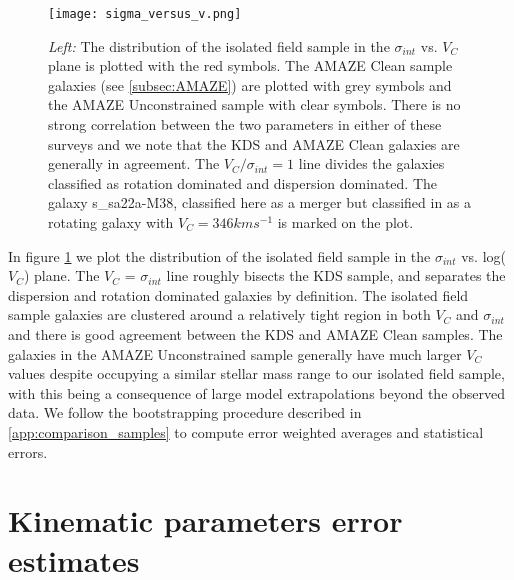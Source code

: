 \documentclass[fleqn,usenatbib]{mn2e}
\begin{document}
\begin{figure}
\centering \hspace{-1.13cm}
\texttt{[image: sigma\_versus\_v.png]}
\caption{{\it Left:} The distribution of the isolated field sample in the $\sigma_{int}$ vs. $V_{C}$ plane is plotted with the red symbols.
The AMAZE Clean sample galaxies (see \protect\cref{subsec:AMAZE}) are plotted with grey symbols and the AMAZE Unconstrained sample with clear symbols.    There is no strong correlation between the two parameters in either of these surveys and we note that the KDS and AMAZE Clean galaxies are generally in agreement.
The $V_{C}/\sigma_{int} = 1$ line divides the galaxies classified as rotation dominated and dispersion dominated.
The galaxy s\_sa22a-M38, classified here as a merger but classified in \protect\cite{Gnerucci2011} as a rotating galaxy with $V_{C} = 346kms^{-1}$ is marked on the plot.}
\label{fig:intrinsic_parameters}
\end{figure}

In figure \ref{fig:intrinsic_parameters} we plot the distribution of the isolated field sample in the $\sigma_{int}$ vs. log($V_{C}$) plane. 
The $V_{C}$ = $\sigma_{int}$ line roughly bisects the KDS sample, and separates the dispersion and rotation dominated galaxies by definition.
The isolated field sample galaxies are clustered around a relatively tight region in both $V_{C}$ and $\sigma_{int}$ and there is good agreement between the KDS and AMAZE Clean samples.
The galaxies in the AMAZE Unconstrained sample generally have much larger $V_{C}$ values despite occupying a similar stellar mass range to our isolated field sample, with this being a consequence of large model extrapolations beyond the observed data.
We follow the bootstrapping procedure described in \cref{app:comparison_samples} to compute error weighted averages and statistical errors.

\section{Kinematic parameters error estimates}\label{app:kin_error_estimates}
\end{document}
